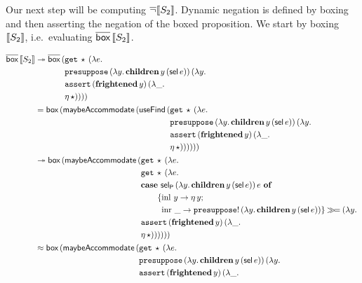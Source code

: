 Our next step will be computing $\mathop{\overline{\lnot}} \llbracket S_2 \rrbracket$. Dynamic negation is
defined by boxing and then asserting the negation of the boxed
proposition. We start by boxing $\llbracket S_2 \rrbracket$, i.e.\ evaluating
$\overline{\textsf{box}}\,\llbracket S_2 \rrbracket$.

\begin{align*}
  \ap{\DBOX}{\sem{S_2}}
  &\tto \ap{\DBOX}{
    \begin{aligned}[t]
      (&\app{\op{get}}{\star}{(\lam{e}{ \\
       &\app{\op{presuppose}}{(\lam{y}{\app{\obj{children}}{y}{(\ap{\sel}{e})}})}{(\lam{y}{ \\
       &\app{\op{assert}}{(\ap{\obj{frightened}}{y})}{(\lam{\_}{ \\
       &\etaE{\star}})}})}})})
    \end{aligned}} \\
  &= \ap{\BOX}{(\ap{\maybeAccommodate}{(\ap{\useFind}{
    \begin{aligned}[t]
      (&\app{\op{get}}{\star}{(\lam{e}{ \\
       &\app{\op{presuppose}}{(\lam{y}{\app{\obj{children}}{y}{(\ap{\sel}{e})}})}{(\lam{y}{ \\
       &\app{\op{assert}}{(\ap{\obj{frightened}}{y})}{(\lam{\_}{ \\
       &\etaE{\star}})}})}})})
    ))\end{aligned}}}} \\
  &\tto \ap{\BOX}{(\ap{\maybeAccommodate}{
    \begin{aligned}[t]
      (&\app{\op{get}}{\star}{(\lam{e}{ \\
       &\app{\op{get}}{\star}{(\lam{e}{ \\
       &\casenl{\app{\selP}{(\lam{y}{\app{\obj{children}}{y}{(\ap{\sel}{e})}})}{e}}{y}{\etaE{y}}{\_}{\ap{\op{presuppose}!}{(\lam{y}{\app{\obj{children}}{y}{(\ap{\sel}{e})}})}} \hsbind (\lam{y}{ \\
       &\app{\op{assert}}{(\ap{\obj{frightened}}{y})}{(\lam{\_}{ \\
       &\etaE{\star}})}})})}})})
    )\end{aligned}}} \\
  &\approx \ap{\BOX}{(\ap{\maybeAccommodate}{
    \begin{aligned}[t]
      (&\app{\op{get}}{\star}{(\lam{e}{ \\
       &\app{\op{presuppose}}{(\lam{y}{\app{\obj{children}}{y}{(\ap{\sel}{e})}})}{(\lam{y}{ \\
       &\app{\op{assert}}{(\ap{\obj{frightened}}{y})}{(\lam{\_}{ \\
}}}}}}
\end{aligned}}}
\end{align*}
